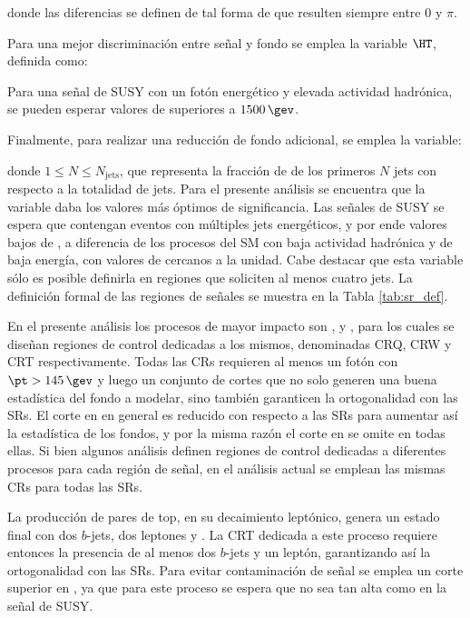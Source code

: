 donde las diferencias se definen de tal forma de que resulten siempre entre $0$ y $\pi$.

Para una mejor discriminación entre señal y fondo se emplea la variable $\HT$, definida como:



Para una señal de SUSY con un fotón energético y elevada actividad hadrónica, se pueden esperar valores de \HT superiores a $1500\,\gev$.

Finalmente, para realizar una reducción de fondo adicional, se emplea la variable:



donde $1\le N \le N_{\text{jets}}$, que representa la fracción de \pt de los primeros $N$ jets con respecto a la totalidad de jets. Para el presente análisis se encuentra que la variable \rtf daba los valores más óptimos de significancia. Las señales de SUSY se espera que contengan eventos con múltiples jets energéticos, y por ende valores bajos de \rtf, a diferencia de los procesos del SM con baja actividad hadrónica y de baja energía, con valores de \rtf cercanos a la unidad. Cabe destacar que esta variable sólo es posible definirla en regiones que soliciten al menos cuatro jets.
La definición formal de las regiones de señales se muestra en la Tabla \ref{tab:sr_def}.




En el presente análisis los procesos de mayor impacto son \phj, \wph y \ttbarph, para los cuales se diseñan regiones de control dedicadas a los mismos, denominadas CRQ, CRW y CRT respectivamente. Todas las CRs requieren al menos un fotón con $\pt>145\,\gev$ y luego un conjunto de cortes que no solo generen una buena estadística del fondo a modelar, sino también garanticen la ortogonalidad con las SRs. El corte en \HT en general es reducido con respecto a las SRs para aumentar así la estadística de los fondos, y por la misma razón el corte en \rtf se omite en todas ellas. 
Si bien algunos análisis definen regiones de control dedicadas a diferentes procesos para cada región de señal, en el análisis actual se emplean las mismas CRs para todas las SRs.

La producción de pares de top, en su decaimiento leptónico, genera un estado final con dos $b$-jets, dos leptones y \met. La CRT dedicada a este proceso requiere entonces la presencia de al menos dos $b$-jets y un leptón, garantizando así la ortogonalidad con las SRs. Para evitar contaminación de señal se emplea un corte superior en \met, ya que para este proceso se espera que no sea tan alta como en la señal de SUSY. 

